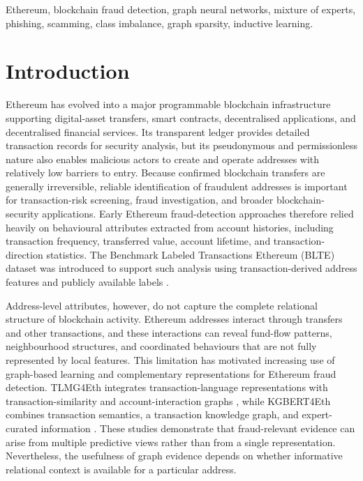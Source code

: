 \documentclass{ieeeaccess}
\begin{document}
\begin{keywords}
Ethereum, blockchain fraud detection, graph neural networks, mixture of experts, phishing, scamming, class imbalance, graph sparsity, inductive learning.
\end{keywords}

\titlepgskip=-15pt
\maketitle

\section{Introduction}

Ethereum has evolved into a major programmable blockchain infrastructure supporting digital-asset transfers, smart contracts, decentralised applications, and decentralised financial services. Its transparent ledger provides detailed transaction records for security analysis, but its pseudonymous and permissionless nature also enables malicious actors to create and operate addresses with relatively low barriers to entry. Because confirmed blockchain transfers are generally irreversible, reliable identification of fraudulent addresses is important for transaction-risk screening, fraud investigation, and broader blockchain-security applications. Early Ethereum fraud-detection approaches therefore relied heavily on behavioural attributes extracted from account histories, including transaction frequency, transferred value, account lifetime, and transaction-direction statistics. The Benchmark Labeled Transactions Ethereum (BLTE) dataset was introduced to support such analysis using transaction-derived address features and publicly available labels \cite{alemari2021blte}.

Address-level attributes, however, do not capture the complete relational structure of blockchain activity. Ethereum addresses interact through transfers and other transactions, and these interactions can reveal fund-flow patterns, neighbourhood structures, and coordinated behaviours that are not fully represented by local features. This limitation has motivated increasing use of graph-based learning and complementary representations for Ethereum fraud detection. TLMG4Eth integrates transaction-language representations with transaction-similarity and account-interaction graphs \cite{sun2025tlmg4eth}, while KGBERT4Eth combines transaction semantics, a transaction knowledge graph, and expert-curated information \cite{jia2026kgbert4eth}. These studies demonstrate that fraud-relevant evidence can arise from multiple predictive views rather than from a single representation. Nevertheless, the usefulness of graph evidence depends on whether informative relational context is available for a particular address.
\end{document}
